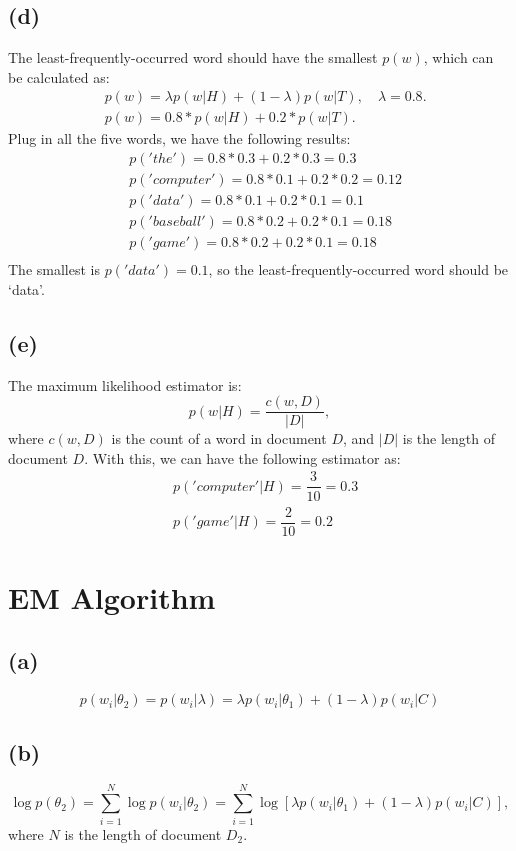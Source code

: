 \subsection*{(d)}
The least-frequently-occurred word should have the smallest $p(w)$, which can be calculated as:
\begin{align*}
& p(w) = \lambda p(w|H)+(1-\lambda)p(w|T), \quad \lambda=0.8. \\
& p(w) = 0.8*p(w|H)+0.2*p(w|T).
\end{align*}
Plug in all the five words, we have the following results:
\begin{align*}
& p('the') = 0.8*0.3 + 0.2*0.3 = 0.3\\
& p('computer') = 0.8*0.1 + 0.2*0.2 =0.12\\
& p('data') = 0.8*0.1 + 0.2*0.1=0.1\\
& p('baseball') = 0.8*0.2 + 0.2*0.1 = 0.18\\
& p('game') = 0.8*0.2 + 0.2*0.1 =0.18\\
\end{align*}
The smallest is $p('data') = 0.1$, so the least-frequently-occurred word should be `data'.

\subsection*{(e)}
The maximum likelihood estimator is:
\begin{equation*}
p(w|H) = \dfrac{c(w,D)}{|D|}, 
\end{equation*}
where $c(w,D)$ is the count of a word in document $D$, and $|D|$ is the length of document $D$. With this, we can have the following estimator as:
\begin{align*}
&p('computer'|H) = \dfrac{3}{10} = 0.3  \\ 
&p('game'|H) = \dfrac{2}{10} = 0.2
\end{align*}


\section{EM Algorithm}
\subsection*{(a)}
\begin{equation*}
p(w_i|\theta_2) = p(w_i|\lambda) = \lambda p(w_i|\theta_1) + (1-\lambda)p(w_i|C)
\end{equation*}

\subsection*{(b)}
\begin{equation*}
\log{p(\theta_2)} = \sum_{i=1}^N \log{p(w_i|\theta_2)} = \sum_{i=1}^N \log{ [\lambda p(w_i|\theta_1) + (1-\lambda)p(w_i|C)]},
\end{equation*}
where $N$ is the length of document $D_2$.

